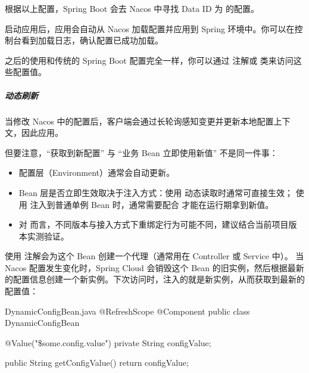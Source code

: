 
根据以上配置，Spring Boot 会去 Nacos 中寻找 Data ID 为 的配置。

启动应用后，应用会自动从 Nacos 加载配置并应用到 Spring 环境中。你可以在控制台看到加载日志，确认配置已成功加载。

之后的使用和传统的 Spring Boot 配置完全一样，你可以通过  注解或  类来访问这些配置值。

\subparagraph{动态刷新}
当修改 Nacos 中的配置后，客户端会通过长轮询感知变更并更新本地配置上下文，因此应用。

但要注意，``获取到新配置'' 与 ``业务 Bean 立即使用新值'' 不是同一件事：
\begin{itemize}
    \item 配置层（Environment）通常会自动更新。
    \item Bean 层是否立即生效取决于注入方式：使用  动态读取时通常可直接生效；
          使用  注入到普通单例 Bean 时，通常需要配合  才能在运行期拿到新值。
    \item 对  而言，不同版本与接入方式下重绑定行为可能不同，建议结合当前项目版本实测验证。
\end{itemize}


使用  注解会为这个 Bean 创建一个代理（通常用在 Controller 或 Service 中）。
当 Nacos 配置发生变化时，Spring Cloud 会销毁这个 Bean 的旧实例，然后根据最新的配置信息创建一个新实例。下次访问时，注入的就是新实例，从而获取到最新的配置值：
\begin{codeblock}[java]{DynamicConfigBean.java}
@RefreshScope
@Component
public class DynamicConfigBean {
    
    @Value("\${some.config.value}")
    private String configValue;
    
    public String getConfigValue() {
        return configValue;
    }
}
\end{codeblock}


